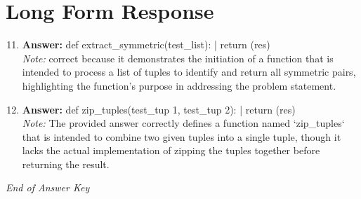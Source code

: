 \documentclass[12pt]{article}
\begin{document}
\section*{Long Form Response}
\begin{enumerate}[label=\arabic*.]
\setcounter{enumi}{10}
\item \textbf{Answer:} def extract\_symmetric(test\_list): | return (res)
\\ \textit{Note:} correct because it demonstrates the initiation of a function that is intended to process a list of tuples to identify and return all symmetric pairs, highlighting the function's purpose in addressing the problem statement.
\item \textbf{Answer:} def zip\_tuples(test\_tup 1, test\_tup 2): | return (res)
\\ \textit{Note:} The provided answer correctly defines a function named `zip\_tuples` that is intended to combine two given tuples into a single tuple, though it lacks the actual implementation of zipping the tuples together before returning the result.
\end{enumerate}

\vfill
\noindent\textit{End of Answer Key}
\end{document}
